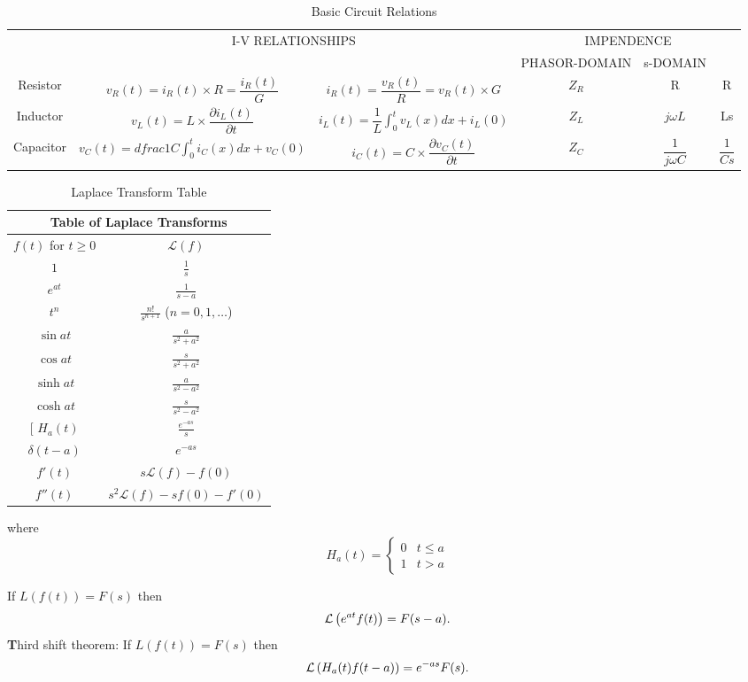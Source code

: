  \begin{table}[h]
	
	\begin{center}
			\begin{tabular}{cccccc}
				\toprule 
				\multirow{1}{*}{}	& \multicolumn{2}{c}{\multirow{ 2}{*}{I-V RELATIONSHIPS}} &	\multicolumn{3}{c}{IMPENDENCE}  \\ \cline{4-6}
				& &	&  PHASOR-DOMAIN & s-DOMAIN & \\ \hline
				Resistor	& $v_R(t)=i_R(t) \times R=\dfrac{i_R(t)}{G}$& $i_R(t)=\dfrac{v_R(t)}{R}=v_R(t) \times G$& $ Z_R $ & R & R\\ \hline
				Inductor	& $v_L(t)=L\times \dfrac{ \partial i_L(t)}{\partial t} $& $i_L(t)=\dfrac{1}{L} \int_{0}^{t} v_L(x)dx+ i_L(0)$& $ Z_L $ &$ j\omega L$ & Ls\\ \hline
				Capacitor	& $v_C(t)=dfrac{1}{C}\int_{0}^{t} i_C(x)dx+ v_C(0)$& $i_C(t)=C\times \dfrac{\partial v_C(t)}{\partial t} $& $ Z_C $ & $ \dfrac{1}{j\omega C} $& $\dfrac{1}{Cs}$\\ 
				\bottomrule
			\end{tabular}
		\caption{Basic Circuit Relations}
	\end{center}
\end{table}


\begin{table}
	\begin{tabular}{|c|c|}
		\hline
		\multicolumn{2}{|c|}{\textbf Table of Laplace Transforms} \\
		\hline
		$ f(t)$ for  $t \geq 0$ &  ${\mathcal{L}}(f)$ \\
		$1$      & $ \frac{1}{s}$\\
		$e^{at}$ & $ \frac{1}{s-a}$\\
		$t^n$    & $ \frac{n!}{s^{n+1}}$ ($n = 0,1, \ldots$)\\
		$\sin at$ & $ \frac{a}{s^2 + a^2}$\\
		$\cos at$ & $ \frac{s}{s^2 + a^2}$\\
		$\sinh at$ & $ \frac{a}{s^2 - a^2}$\\
		$\cosh at$ & $ \frac{s}{s^2 - a^2}$\\[
		$H_a(t)$ & $\displaystyle \frac{e^{-as}}{s}$\\
		$\delta(t-a)$ & $\displaystyle e^{-as}$\\
		$f'(t)$ & $s{\mathcal{L}}(f)-f(0)$\\
		$f''(t)$ & $s^2{\mathcal{L}}(f)-sf(0)-f'(0)$\\ \hline
	\end{tabular}
	\caption{Laplace Transform Table}
\end{table}


where 
\[
H_a(t)=\left\{\begin{array}{ll}0&t \le a\\1&t>a\end{array}\right.
\]

 If $L(f(t))=F(s)$ then
\[ {\cal L}\left(e^{at}f(t)\right)=F(s-a).\]
{\textbf Third shift theorem:} If ${L}(f(t))=F(s)$ then
\[ {\cal L}\left(H_a(t)f(t-a)\right)=e^{-as}F(s).\]